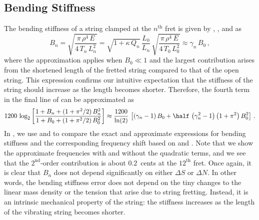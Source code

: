 \subsection{Bending Stiffness\label{sct:model_stiffness}}
The bending stiffness of a string clamped at the $n^{\mathrm{th}}$ fret is given by , , and  as
\begin{equation} \label{eqn:bg_n_def}
  B_n = \sqrt{\frac{\pi\, \rho^4\, E}{4\, T_n\, L_n^2}} = \sqrt{1 + \kappa\, Q_n}\, \frac{L_0}{L_n}\, \sqrt{\frac{\pi\, \rho^4\, E}{4\, T_0\, L_0^2}} \approx \gamma_n\, B_0\, ,
\end{equation}
where the approximation applies when $B_0 \ll 1$ and the largest contribution arises from the shortened length of the fretted string compared to that of the open string. This expression confirms our intuitive expectation that the stiffness of the string should increase as the length becomes shorter.
Therefore, the fourth term in the final line of  can be approximated as
 \begin{equation} \label{eqn:dnu_bn}
1200\, \log_2 \left[ \frac{1 + B_n + (1 + \pi^2/2)\, B_n^2}{1 + B_0 + (1 + \pi^2/2)\, B_0^2} \right] \approx \frac{1200}{\ln(2)}\, \left[ \left(\gamma_n - 1\right) B_0 + \half\, \left(\gamma_n^2 - 1\right) \left(1 + \pi^2\right) B_0^2 \right]\, .
 \end{equation}
In , we use  and  to compare the exact and approximate expressions for bending stiffness and the corresponding frequency shift based on   and . Note that we show the approximate frequencies with and without the quadratic terms, and we see that the $2^\mathrm{nd}$-order contribution is about $0.2$~cents at the $12^\mathrm{th}$ fret. Once again, it is clear that $B_n$ does not depend significantly on either $\Delta S$ or $\Delta N$. In other words, the bending stiffness error does not depend on the tiny changes to the linear mass density or the tension that arise due to string fretting. Instead, it is an intrinsic mechanical property of the string: the stiffness increases as the length of the vibrating string becomes shorter.

